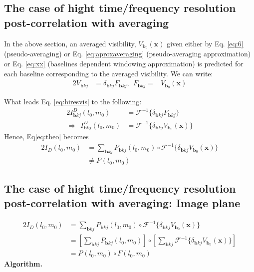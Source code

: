 \subsection{The case of hight time/frequency resolution post-correlation with averaging}
In the above section, an averaged visibility, $V_{\mathbf{b}_0}(\mathbf{x})$ given either by Eq. \ref{eq:6} (pseudo-averaging)
or Eq. \ref{eq:aproxaveraging} (pseudo-averaging approximation) or 
Eq. \ref{eq:xx} (baselines dependent windowing approximation) is predicted for each  baseline
corresponding to the averaged visibility. We can write:
\begin{alignat}{2}
V_{\mathbf{b}kj}&=\delta_{\mathbf{b}kj}F_{\mathbf{b}{kj}}, ~~
F_{\mathbf{b}kj}=& V_{\mathbf{b}_0}(\mathbf{x})
\end{alignat}

What leads Eq. \ref{eq:hiresvis} to the following:
\begin{alignat}{2}
I^{D}_{\mathbf{b}kj}(l_0,m_0)&= \mathcal{F}^{-1}\{\delta_{\mathbf{b}kj}F_{\mathbf{b}{kj}}\}\\ \Rightarrow ~~
I^{D}_{\mathbf{b}kj}(l_0,m_0)&=	\mathcal{F}^{-1}\{\delta_{\mathbf{b}kj}V_{\mathbf{b}_0}(\mathbf{x})\}
\end{alignat}
Hence, Eq\ref{eq:theo} becomes
\begin{alignat}{2}
I_{D}(l_0,m_0)&=\sum_{\mathbf{b} kj}P_{\mathbf{b}kj}(l_0,m_0)\circ \mathcal{F}^{-1}\{\delta_{\mathbf{b}kj}V_{\mathbf{b}_0}(\mathbf{x})\}\\
	      &\neq P_{}(l_0,m_0)
\end{alignat}
\subsection{The case of hight time/frequency resolution post-correlation with averaging: Image plane}
\begin{alignat}{2}
I_{D}(l_0,m_0)&=\sum_{\mathbf{b} kj}P_{\mathbf{b}kj}(l_0,m_0)\circ \mathcal{F}^{-1}\{\delta_{\mathbf{b}kj}V_{\mathbf{b}_0}(\mathbf{x})\}\\
	     &=[\sum_{\mathbf{b} kj}P_{\mathbf{b}kj}(l_0,m_0)]\circ [\sum_{\mathbf{b} kj}\mathcal{F}^{-1}\{\delta_{\mathbf{b}kj}V_{\mathbf{b}_0}(\mathbf{x})\}]\\
	     &=P_{}(l_0,m_0)\circ F(l_0,m_0)
\end{alignat}
{\bf Algorithm.}

